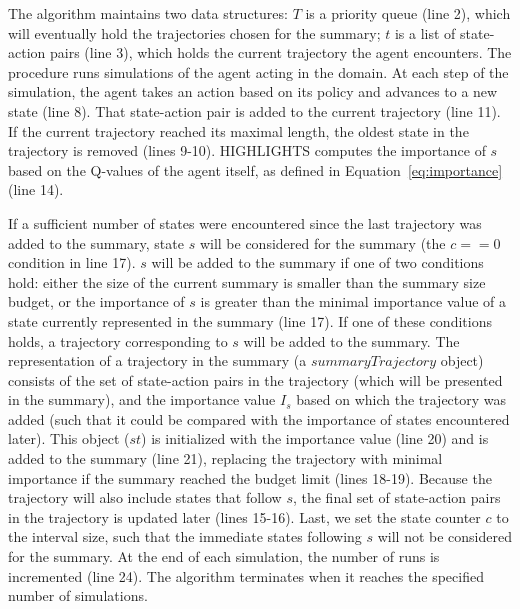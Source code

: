 The algorithm maintains two data structures: $T$ is a priority queue (line 2), which will eventually hold the trajectories chosen for the summary; $t$ is a list of state-action pairs (line 3), which holds the current trajectory the agent encounters. The procedure runs simulations of the agent acting in the domain. At each step of the simulation, the agent takes an action based on its policy and advances to a new state (line 8). That state-action pair is added to the current trajectory (line 11). If the current trajectory reached its maximal length, the oldest state in the trajectory is removed (lines 9-10).  HIGHLIGHTS computes the importance of $s$ based on the Q-values of the agent itself, as defined in Equation~\ref{eq:importance} (line 14). 

If a sufficient number of states were encountered since the last trajectory was added to the summary, state $s$ will be considered for the summary (the $c==0$ condition in line 17). $s$ will be added to the summary if one of two conditions hold: either the size of the current summary is smaller than the summary size budget, or the importance of $s$ is greater than the minimal importance value of a state currently represented in the summary (line 17). If one of these conditions holds, a trajectory corresponding to $s$ will be added to the summary. The representation of a trajectory in the summary (a $summaryTrajectory$ object) consists of the set of state-action pairs in the trajectory (which will be presented in the summary), and the importance value $I_{s}$ based on which the trajectory was added (such that it could be compared with the importance of states encountered later). This object ($st$) is initialized with the importance value (line 20) and is added to the summary (line 21), replacing the trajectory with minimal importance if the summary reached the budget limit (lines 18-19).
Because the trajectory will also include states that follow $s$, the final set of state-action pairs in the trajectory is updated later (lines 15-16). Last, we set the state counter $c$ to the interval size, such that the immediate states following $s$ will not be considered for the summary. At the end of each simulation, the number of runs is incremented (line 24). The algorithm terminates when it reaches the specified number of simulations. 

